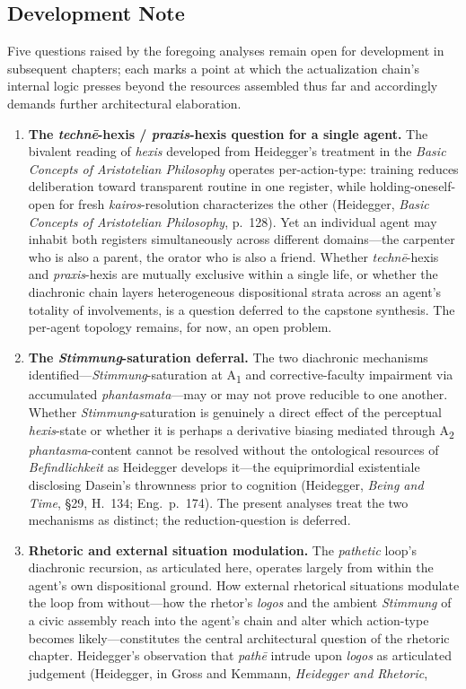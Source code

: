 \documentclass{article}
\begin{document}

\subsection*{Development Note}

Five questions raised by the foregoing analyses remain open for development in subsequent chapters; each marks a point at which the actualization chain's internal logic presses beyond the resources assembled thus far and accordingly demands further architectural elaboration. \begin{enumerate}

\item \textbf{The \textit{technē}-hexis / \textit{praxis}-hexis question for a single agent.} The bivalent reading of \textit{hexis} developed from Heidegger's treatment in the \textit{Basic Concepts of Aristotelian Philosophy} operates per-action-type: training reduces deliberation toward transparent routine in one register, while holding-oneself-open for fresh \textit{kairos}-resolution characterizes the other (Heidegger, \textit{Basic Concepts of Aristotelian Philosophy}, p.~128). Yet an individual agent may inhabit both registers simultaneously across different domains---the carpenter who is also a parent, the orator who is also a friend. Whether \textit{technē}-hexis and \textit{praxis}-hexis are mutually exclusive within a single life, or whether the diachronic chain layers heterogeneous dispositional strata across an agent's totality of involvements, is a question deferred to the capstone synthesis. The per-agent topology remains, for now, an open problem. \item \textbf{The \textit{Stimmung}-saturation deferral.} The two diachronic mechanisms identified---\textit{Stimmung}-saturation at A\textsubscript{1} and corrective-faculty impairment via accumulated \textit{phantasmata}---may or may not prove reducible to one another. Whether \textit{Stimmung}-saturation is genuinely a direct effect of the perceptual \textit{hexis}-state or whether it is perhaps a derivative biasing mediated through A\textsubscript{2} \textit{phantasma}-content cannot be resolved without the ontological resources of \textit{Befindlichkeit} as Heidegger develops it---the equiprimordial existentiale disclosing Dasein's thrownness prior to cognition (Heidegger, \textit{Being and Time}, \S29, H.~134; Eng.~p.~174). The present analyses treat the two mechanisms as distinct; the reduction-question is deferred. \item \textbf{Rhetoric and external situation modulation.} The \textit{pathetic} loop's diachronic recursion, as articulated here, operates largely from within the agent's own dispositional ground. How external rhetorical situations modulate the loop from without---how the rhetor's \textit{logos} and the ambient \textit{Stimmung} of a civic assembly reach into the agent's chain and alter which action-type becomes likely---constitutes the central architectural question of the rhetoric chapter. Heidegger's observation that \textit{pathē} intrude upon \textit{logos} as articulated judgement (Heidegger, in Gross and Kemmann, \textit{Heidegger and Rhetoric}, 
\end{enumerate}
\end{document}
